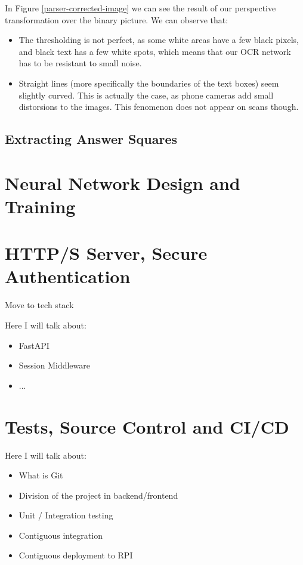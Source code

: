 \documentclass[12pt, a4paper]{report}
\begin{document}
In Figure \ref{parser-corrected-image} we can see the result of our perspective transformation over the binary picture. We can observe that:

\begin{itemize}
	\item The thresholding is not perfect, as some white areas have a few black pixels, and black text has a few white spots, which means that our OCR network has to be resistant to small noise.
	\item Straight lines (more specifically the boundaries of the text boxes) seem slightly curved. This is actually the case, as phone cameras add small distorsions to the images. This fenomenon does not appear on scans though.
\end{itemize}

\section{Extracting Answer Squares}


\chapter{Neural Network Design and Training}

\chapter{HTTP/S Server, Secure Authentication}

Move to tech stack

Here I will talk about:
\begin{itemize}
    \item FastAPI
    \item Session Middleware
    \item ...
\end{itemize}


\chapter{Tests, Source Control and CI/CD}

Here I will talk about:
\begin{itemize}
    \item What is Git
    \item Division of the project in backend/frontend
    \item Unit / Integration testing
    \item Contiguous integration
    \item Contiguous deployment to RPI
\end{itemize}
\end{document}
